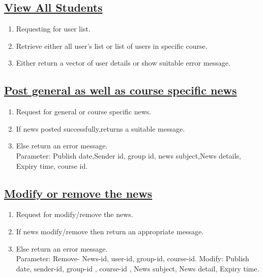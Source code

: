 \documentclass{article}
\begin{document}
\subsection*{\underline{View All Students}}
\begin{enumerate}
	\item Requesting for user list.
	\item Retrieve either all user's list or list of users in specific course.
	\item Either return a vector of user details or show suitable error message.
\begin{center}

\end{center}
\end{enumerate}
\subsection*{\underline{Post general as well as course specific news}}
\begin{enumerate}
\item Request for general or course specific news.
\item If news posted  successfully,returns a suitable message.
\item Else return an error message.\\
         Parameter: Publish date,Sender id, group id, news subject,News details, Expiry time, course id.
\begin{center}

\end{center}
\end{enumerate}
\subsection*{\underline{Modify or remove the news}}
\begin{enumerate}
	\item Request for modify/remove the news.
	\item If news modify/remove then return an appropriate message.
	\item Else return an error message.\\
        	Parameter:  Remove- News-id, user-id, group-id, course-id.
       	    Modify: Publish date, sender-id, group-id , course-id , News subject, News detail, Expiry time.
\begin{center}

\end{center}
\end{enumerate}
\end{document}
